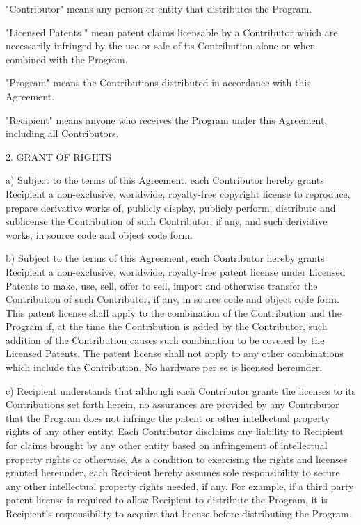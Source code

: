 \documentclass[10pt,letterpaper,titlepage]{article}
\begin{document}
"Contributor" means any person or entity that distributes the Program.

"Licensed Patents " mean patent claims licensable by a Contributor which are necessarily infringed by the use or sale of its Contribution alone or when combined with the Program.

"Program" means the Contributions distributed in accordance with this Agreement.

"Recipient" means anyone who receives the Program under this Agreement, including all Contributors.

2. GRANT OF RIGHTS

a) Subject to the terms of this Agreement, each Contributor hereby grants Recipient a non-exclusive, worldwide, royalty-free copyright license to reproduce, prepare derivative works of, publicly display, publicly perform, distribute and sublicense the Contribution of such Contributor, if any, and such derivative works, in source code and object code form.

b) Subject to the terms of this Agreement, each Contributor hereby grants Recipient a non-exclusive, worldwide, royalty-free patent license under Licensed Patents to make, use, sell, offer to sell, import and otherwise transfer the Contribution of such Contributor, if any, in source code and object code form. This patent license shall apply to the combination of the Contribution and the Program if, at the time the Contribution is added by the Contributor, such addition of the Contribution causes such combination to be covered by the Licensed Patents. The patent license shall not apply to any other combinations which include the Contribution. No hardware per se is licensed hereunder.

c) Recipient understands that although each Contributor grants the licenses to its Contributions set forth herein, no assurances are provided by any Contributor that the Program does not infringe the patent or other intellectual property rights of any other entity. Each Contributor disclaims any liability to Recipient for claims brought by any other entity based on infringement of intellectual property rights or otherwise. As a condition to exercising the rights and licenses granted hereunder, each Recipient hereby assumes sole responsibility to secure any other intellectual property rights needed, if any. For example, if a third party patent license is required to allow Recipient to distribute the Program, it is Recipient's responsibility to acquire that license before distributing the Program.
\end{document}
